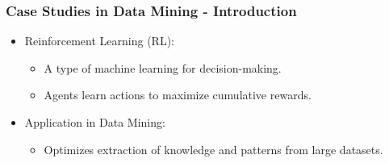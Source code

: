 \documentclass[aspectratio=169]{beamer}
\begin{document}
\begin{frame}[fragile]
    \frametitle{Case Studies in Data Mining - Introduction}
    \begin{itemize}
        \item Reinforcement Learning (RL):
        \begin{itemize}
            \item A type of machine learning for decision-making.
            \item Agents learn actions to maximize cumulative rewards.
        \end{itemize}
        \item Application in Data Mining:
        \begin{itemize}
            \item Optimizes extraction of knowledge and patterns from large datasets.
        \end{itemize}
    \end{itemize}
\end{frame}
\end{document}

